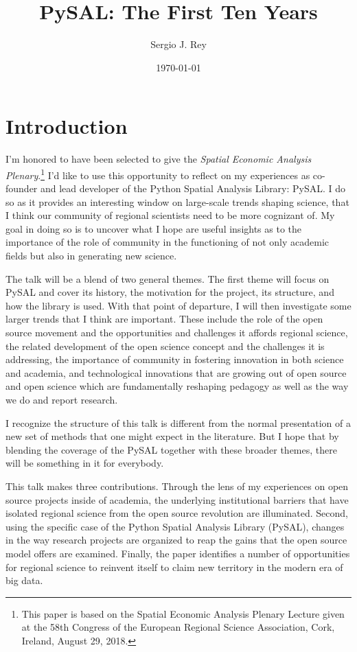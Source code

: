 \documentclass[11pt]{article}
\author{Sergio J. Rey}
\date{\today}
\title{PySAL: The First Ten Years}
\begin{document}
\maketitle
\section*{Introduction}
\label{sec:org8a5fc20}

I'm honored to have been selected to give the \emph{Spatial Economic Analysis
Plenary}.\footnote{This paper is based on the Spatial Economic Analysis Plenary Lecture
given at the 58th Congress of the European Regional Science Association, Cork,
Ireland, August 29, 2018.} I'd like to use this opportunity to reflect on my experiences as
co-founder and lead developer of the Python Spatial Analysis Library: PySAL. I
do so as it provides an interesting window on large-scale trends shaping
science, that I think our community of regional scientists need to be more
cognizant of. My goal in doing so is to uncover what I hope are useful insights
as to the importance of the role of community in the functioning of not only
academic fields but also in generating new science.


The talk will be a blend of two general themes. The first theme will focus on
PySAL and cover its history, the motivation for the project, its structure, and
how the library is used. With that point of departure, I will then
investigate some  larger trends that I think are important. These
include the role of the open source movement and the opportunities and
challenges it affords regional science, the related development of the open
science concept and the challenges it is addressing, the importance of
community in fostering innovation in both science and academia, and
technological innovations that are growing out of open source and open science
which are fundamentally reshaping pedagogy as well as the way we do and report
research.

I recognize the structure of this talk is different from the normal
presentation of a new set of methods that one might expect in the literature.
But I hope that by blending the coverage of the PySAL together with these
broader themes, there will be something in it for everybody.

This talk makes three contributions. Through the lens of my
experiences on open source projects inside of academia, the underlying
institutional barriers that have isolated regional science from the open source
revolution are illuminated. Second, using the specific case of the Python
Spatial Analysis Library (PySAL), changes in the way research projects are
organized to reap the gains that the open source model offers are examined.
Finally, the paper identifies a number of opportunities for regional science to
reinvent itself to claim new territory in the modern era of big data.
\end{document}
